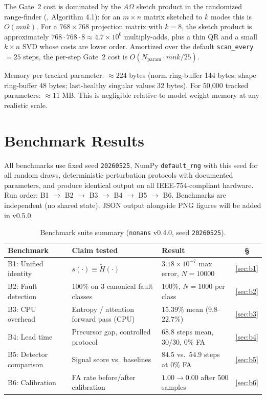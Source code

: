 \documentclass[11pt,a4paper]{article}
\theoremstyle{plain}
\begin{document}
The Gate~2 cost is dominated by the $A\Omega$ sketch product in the
randomized range-finder (\citealt{halko2011finding}, Algorithm 4.1):
for an $m \times n$ matrix sketched to $k$ modes this is $O(mnk)$.
For a $768 \times 768$ projection matrix with $k = 8$, the sketch
product is approximately $768 \cdot 768 \cdot 8 \approx 4.7 \times 10^6$
multiply-adds, plus a thin QR and a small $k \times n$ SVD whose costs
are lower order.
Amortized over the default \texttt{scan\_every}~$=25$ steps, the
per-step Gate~2 cost is $O(N_\text{param} \cdot mnk / 25)$.

Memory per tracked parameter: $\approx 224$ bytes
(norm ring-buffer 144 bytes; shape ring-buffer 48 bytes;
last-healthy singular values 32 bytes).
For 50,000 tracked parameters: $\approx 11$ MB.
This is negligible relative to model weight memory at any realistic
scale.


\section{Benchmark Results}
\label{sec:benchmarks}

All benchmarks use fixed seed \texttt{20260525},
NumPy \texttt{default\_rng} with this seed for all random draws,
deterministic perturbation protocols with documented parameters,
and produce identical output on all IEEE-754-compliant hardware.
Run order: B1 $\to$ B2 $\to$ B3 $\to$ B4 $\to$ B5 $\to$ B6.
Benchmarks are independent (no shared state).
JSON output alongside PNG figures will be added in v0.5.0.

\begin{table}[h!]
\centering
\caption{Benchmark suite summary (\texttt{nonans} v0.4.0, seed \texttt{20260525}).}
\label{tab:benchmarks}
\footnotesize
\setlength{\tabcolsep}{5pt}
\begin{tabular}{@{}p{2.6cm}p{4.2cm}p{5.2cm}c@{}}
\toprule
Benchmark & Claim tested & Result & \S \\
\midrule
B1: Unified identity &
  $s(\cdot) \equiv \tilde{H}(\cdot)$ &
  $3.18 \times 10^{-7}$ max error, $N{=}\num{10000}$ &
  \ref{sec:b1} \\
B2: Fault detection &
  100\% on 3 canonical fault classes &
  100\%, $N{=}1000$ per class &
  \ref{sec:b2} \\
B3: CPU overhead &
  Entropy / attention forward pass (CPU) &
  $15.39\%$ mean ($9.8$--$22.7\%$) &
  \ref{sec:b3} \\
B4: Lead time &
  Precursor gap, controlled protocol &
  $68.8$ steps mean, $30/30$, $0\%$ FA &
  \ref{sec:b4} \\
B5: Detector comparison &
  Signal score vs.\ baselines &
  $84.5$ vs.\ $54.9$ steps at $0\%$ FA &
  \ref{sec:b5} \\
B6: Calibration &
  FA rate before/after calibration &
  $1.00 \to 0.00$ after 500 samples &
  \ref{sec:b6} \\
\bottomrule
\end{tabular}
\end{table}
\end{document}

